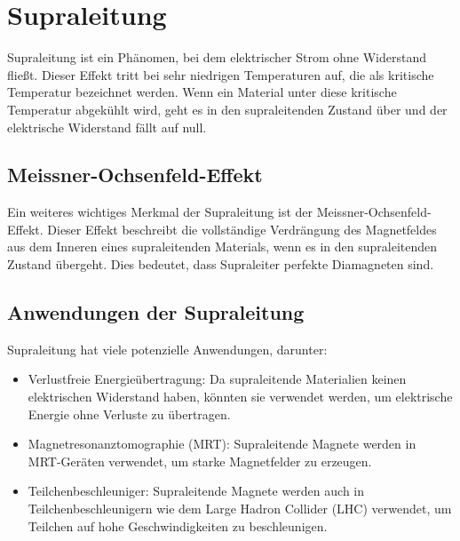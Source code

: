 \documentclass[a4paper]{scrartcl}
\begin{document}
\section{Supraleitung}
Supraleitung ist ein Phänomen, bei dem elektrischer Strom ohne Widerstand fließt. Dieser Effekt tritt 
bei sehr niedrigen Temperaturen auf, die als kritische Temperatur bezeichnet werden. Wenn ein Material 
unter diese kritische Temperatur abgekühlt wird, geht es in den supraleitenden Zustand über und der 
elektrische Widerstand fällt auf null.

\subsection{Meissner-Ochsenfeld-Effekt}
Ein weiteres wichtiges Merkmal der Supraleitung ist der Meissner-Ochsenfeld-Effekt. Dieser Effekt 
beschreibt die vollständige Verdrängung des Magnetfeldes aus dem Inneren eines supraleitenden Materials, 
wenn es in den supraleitenden Zustand übergeht. Dies bedeutet, dass Supraleiter perfekte Diamagneten sind.

\subsection{Anwendungen der Supraleitung}
Supraleitung hat viele potenzielle Anwendungen, darunter:
\begin{itemize}
    \item Verlustfreie Energieübertragung: Da supraleitende Materialien keinen elektrischen Widerstand haben, 
    könnten sie verwendet werden, um elektrische Energie ohne Verluste zu übertragen.
    \item Magnetresonanztomographie (MRT): Supraleitende Magnete werden in \\ MRT-Geräten verwendet, um starke 
    Magnetfelder zu erzeugen.
    \item Teilchenbeschleuniger: Supraleitende Magnete werden auch in Teilchenbeschleunigern wie dem Large 
    Hadron Collider (LHC) verwendet, um Teilchen auf hohe Geschwindigkeiten zu beschleunigen.
\end{itemize}
\end{document}
